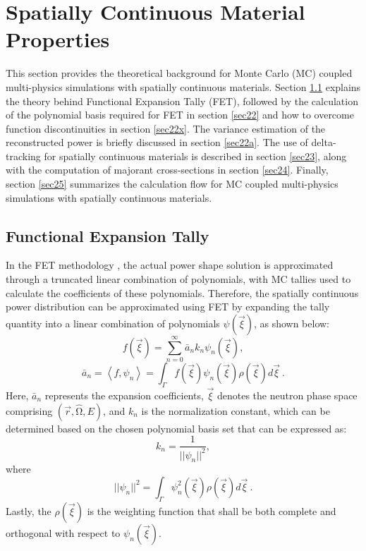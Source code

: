 \newpage 
\section{Spatially Continuous Material Properties} \label{s2}

This section provides the theoretical background for Monte Carlo (MC) coupled multi-physics simulations with spatially continuous materials. Section \ref{sec21} explains the theory behind Functional Expansion Tally (FET), followed by the calculation of the polynomial basis required for FET in section \ref{sec22} and how to overcome function discontinuities in section \ref{sec22x}. The variance estimation of the reconstructed power is briefly discussed in section \ref{sec22a}. The use of delta-tracking for spatially continuous materials is described in section \ref{sec23}, along with the computation of majorant cross-sections in section \ref{sec24}. Finally, section \ref{sec25} summarizes the calculation flow for MC coupled multi-physics simulations with spatially continuous materials.

\subsection{Functional Expansion Tally} \label{sec21}

In the FET methodology \cite{gries, ellis}, the actual power shape solution is approximated through a truncated linear combination of polynomials, with MC tallies used to calculate the coefficients of these polynomials. Therefore, the spatially continuous power distribution can be approximated using FET by expanding the tally quantity into a linear combination of polynomials $\psi(\vec{\xi})$, as shown below:
\begin{equation}
    f\left(\vec{\xi}\right)=\sum_{n=0}^{\infty}{{\bar{a}}_nk_n\psi_n\left(\vec{\xi}\right)},
    \label{eq1}
\end{equation}
\begin{equation}
    {\bar{a}}_n=\left\langle f,\psi_n\right\rangle=\int_{\Gamma}{f\left(\vec{\xi}\right)\psi_n\left(\vec{\xi}\right)\rho\left(\vec{\xi}\right)d\vec{\xi}\ }.
    \label{eq2}
\end{equation}
Here, ${\bar{a}}_n$ represents the expansion coefficients, $\vec{\xi}$ denotes the neutron phase space comprising $\left(\vec{r},\hat{\mathrm{\Omega}},E\right)$, and $k_n$ is the normalization constant, which can be determined based on the chosen polynomial basis set that can be expressed as:
\begin{equation}
    k_n=\frac{1}{||\psi_n||^2},
\end{equation}
where
\begin{equation}
    ||\psi_n||^2=\int_{\Gamma}{\psi_n^2\left(\vec{\xi}\right)\rho\left(\vec{\xi}\right)d}\vec{\xi}\ .
    \label{eq4}
\end{equation}
Lastly, the $\rho\left(\vec{\xi}\right)$ is the weighting function that shall be both complete and orthogonal with respect to $\psi_n\left(\vec{\xi}\right)$.

